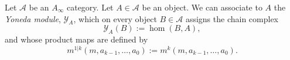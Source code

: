 
Let $\mathcal A$ be an $A_\infty$ category. Let $A\in \mathcal A$ be an object. We can associate to $A$ the \emph{Yoneda module}, $\mathcal Y_A$, which on every object $B\in \mathcal A$ assigns the chain complex
\[\mathcal Y_A(B):=\hom(B, A),\]
and whose product maps are defined by 
\[m^{1|k}(m,a_{k-1}, \ldots, a_0):= m^k(m,a_{k-1}, \ldots, a_0).\]
\label{exm:yonedaModule}
